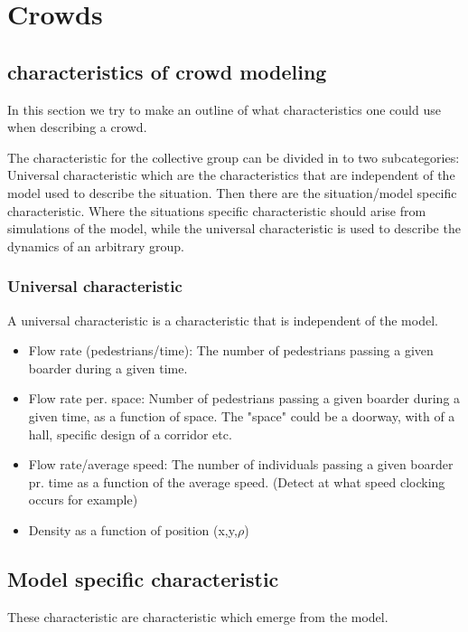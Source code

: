 \section{Crowds}
\label{sec:crowds}

\subsection{characteristics of crowd modeling}
In this section we try to make an outline of what characteristics one could use when
describing a crowd.

The characteristic for the collective group can be divided in to two 
subcategories: Universal characteristic which are the characteristics that are 
independent of the model used to describe the situation. Then there are the 
situation/model specific characteristic.  Where the situations specific 
characteristic should arise from simulations of the model, while the universal 
characteristic is used to describe the dynamics of an arbitrary group. 

\subsubsection{Universal characteristic}
A universal characteristic is a characteristic that is independent of the model.

\begin{itemize}
    \item Flow rate (pedestrians/time): The number of pedestrians passing a 
        given boarder during a given time.

    \item Flow rate per. space: Number of pedestrians passing a given boarder 
        during a given time, as a function of space. The "space" could be a 
        doorway, with of a hall, specific design of a corridor etc.

    \item Flow rate/average speed: The number of individuals passing a given 
        boarder pr.  time as a function of the average speed. (Detect at what 
        speed clocking occurs for example)

    \item Density as a function of position (x,y,$\rho$)
\end{itemize}

\subsection{Model specific characteristic}
These characteristic are characteristic which emerge from the model.

